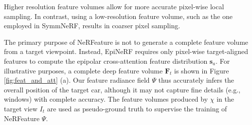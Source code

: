 Higher resolution feature volumes allow for more accurate pixel-wise local sampling. In contrast, using a low-resolution feature volume, such as the one employed in SymmNeRF, results in coarser pixel sampling.



The primary purpose of NeRFeature is not to generate a complete feature volume from a target viewpoint. Instead, EpiNeRF requires only pixel-wise target-aligned features to compute the epipolar cross-attention feature distribution $\mathbf{s}_{a}$. For illustrative purposes, a complete deep feature volume $\mathbf{F}_{t}$ is shown in Figure \ref{fig:feat_and_att} (a). Our feature radiance field $\Psi$ thus accurately infers the overall position of the target car, although it may not capture fine details (e.g., windows) with complete accuracy. The feature volumes produced by $\chi$ in the target view $I_{t}$ are used as pseudo-ground truth to supervise the training of NeRFeature $\Psi$. \newline

